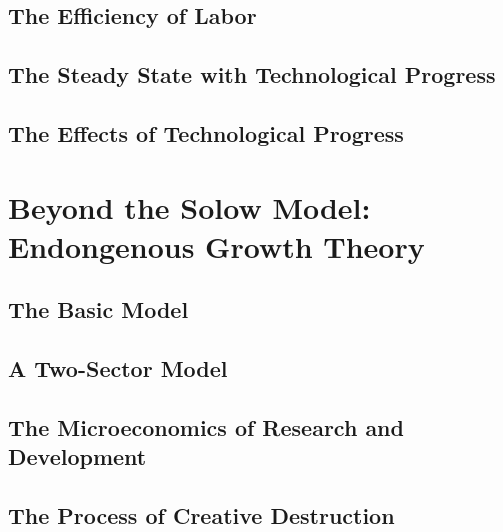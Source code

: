 \subsection*{The Efficiency of Labor}

\subsection*{The Steady State with Technological Progress}

\subsection*{The Effects of Technological Progress}

\section*{Beyond the Solow Model: Endongenous Growth Theory}

\subsection*{The Basic Model}

\subsection*{A Two-Sector Model}

\subsection*{The Microeconomics of Research and Development}

\subsection*{The Process of Creative Destruction}

